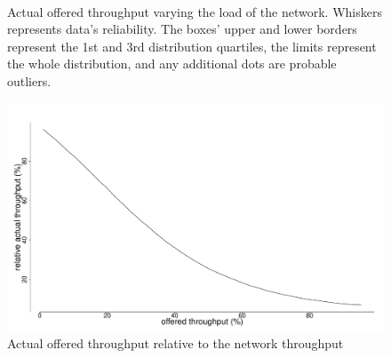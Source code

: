 \documentclass[conference]{IEEEtran}
\begin{document}
\begin{figure}[t]
    \centering
    \\
    \caption{Actual offered throughput varying the load of the network. Whiskers represents data’s reliability. The boxes’ upper and lower borders represent the 1st and 3rd distribution quartiles, the limits represent the whole distribution, and any additional dots are probable outliers.}
    \label{grph:sim24}
\end{figure}

\begin{figure}[t]
    \centering
    \includegraphics[width=\columnwidth]{graphs/Sim3}
    \caption{Actual offered throughput relative to the network throughput}
    \label{grph:sim3}
\end{figure}
\end{document}
